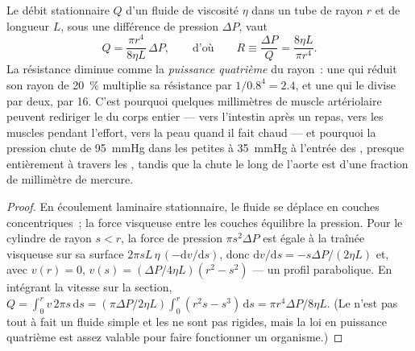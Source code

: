 \begin{theorem}\label{thm:b2:blood-circulation:poiseuille}
Le débit stationnaire $Q$ d'un fluide de viscosité $\eta$ dans un tube
de rayon $r$ et de longueur $L$, sous une différence de pression
$\Delta P$, vaut
\[
Q = \frac{\pi r^{4}}{8\eta L}\,\Delta P, \qquad \text{d'où}\qquad
R \equiv \frac{\Delta P}{Q} = \frac{8\eta L}{\pi r^{4}} .
\]
La résistance diminue comme la \emph{puissance quatrième} du rayon~: une
 qui réduit son rayon de \qty{20}{\%} multiplie sa résistance
par $1/0.8^{4} = 2.4$, et une  qui le divise par deux, par 16.
C'est pourquoi quelques millimètres de muscle artériolaire peuvent
rediriger le  du corps entier --- vers l'intestin après un repas,
vers les muscles pendant l'effort, vers la peau quand il fait chaud ---
et pourquoi la pression chute de \qty{95}{mmHg} dans les petites
 à \qty{35}{mmHg} à l'entrée des , presque entièrement
à travers les , tandis que la chute le long de l'aorte est
d'une fraction de millimètre de mercure.
\end{theorem}
\begin{proof}
En écoulement laminaire stationnaire, le fluide se déplace en couches
concentriques~; la force visqueuse entre les couches équilibre la
pression. Pour le cylindre de rayon $s < r$, la force de pression
$\pi s^{2}\Delta P$ est égale à la traînée visqueuse sur sa surface
$2\pi s L\,\eta\,(-\mathrm{d}v/
\mathrm{d}s)$, donc $\mathrm{d}v/\mathrm{d}s = -s\Delta P/(2\eta L)$
et, avec $v(r) = 0$, $v(s) = (\Delta P/4\eta L)(r^{2} - s^{2})$ --- un
profil parabolique. En intégrant la vitesse sur la section,
$Q = \int_{0}^{r} v\,2\pi s\,\mathrm{d}s = (\pi\Delta P/2\eta L)
\int_{0}^{r}(r^{2}s - s^{3})\,\mathrm{d}s = \pi r^{4}\Delta P/8\eta
L$. (Le  n'est pas tout à fait un fluide simple et les  ne
sont pas rigides, mais la loi en puissance quatrième est assez valable
pour faire fonctionner un organisme.)
\end{proof}

